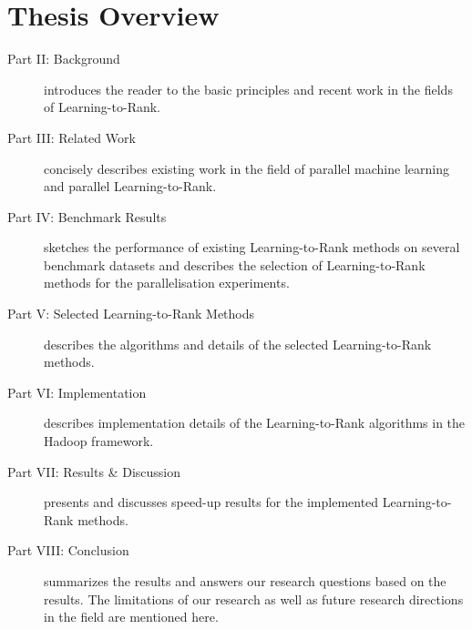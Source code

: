 \chapter{Thesis Overview}

\begin{description}
\item[Part II: Background]{introduces the reader to the basic principles and recent work in the fields of Learning-to-Rank.}
\item[Part III: Related Work]{concisely describes existing work in the field of parallel machine learning and parallel Learning-to-Rank.}
\item[Part IV: Benchmark Results]{sketches the performance of existing Learning-to-Rank methods on several benchmark datasets and describes the selection of Learning-to-Rank methods for the parallelisation experiments.}
\item[Part V: Selected Learning-to-Rank Methods]{describes the algorithms and details of the selected Learning-to-Rank methods.}
\item[Part VI: Implementation]{describes implementation details of the Learning-to-Rank algorithms in the Hadoop framework.}
\item[Part VII: Results \& Discussion]{presents and discusses speed-up results for the implemented Learning-to-Rank methods.}
\item[Part VIII: Conclusion]{summarizes the results and answers our research questions based on the results. The limitations of our research as well as future research directions in the field are mentioned here.}
\end{description}
